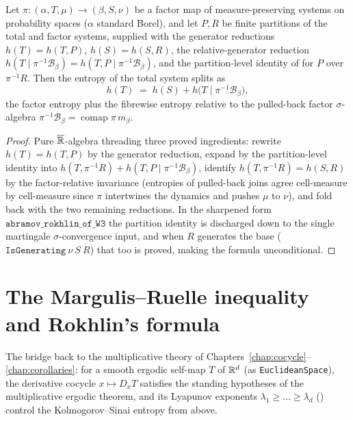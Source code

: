 \begin{theorem}\label{abramov_rokhlin}
  \leanok
  Let \(\pi:(\alpha,T,\mu)\to(\beta,S,\nu)\) be a factor map of measure-preserving systems on
  probability spaces (\(\alpha\) standard Borel), and let \(P, R\) be finite partitions of the
  total and factor systems, supplied with the generator reductions \(h(T)=h(T,P)\),
  \(h(S)=h(S,R)\), the relative-generator reduction
  \(h(T\mid\pi^{-1}\mathcal B_\beta)=h(T,P\mid\pi^{-1}\mathcal B_\beta)\), and the
  partition-level identity of  for \(P\) over \(\pi^{-1}R\). Then
  the entropy of the total system splits as
  \[
    h(T) \;=\; h(S) + h\bigl(T \mid \pi^{-1}\mathcal B_\beta\bigr),
  \]
  the factor entropy plus the fibrewise entropy relative to the pulled-back factor
  \(\sigma\)-algebra \(\pi^{-1}\mathcal B_\beta=\operatorname{comap}\pi\,m_\beta\).
\end{theorem}
\begin{proof}\leanok
  Pure \(\overline{\mathbb{R}}\)-algebra threading three proved ingredients: rewrite \(h(T)=h(T,P)\) by the
  generator reduction, expand by the partition-level identity into
  \(h(T,\pi^{-1}R)+h(T,P\mid\pi^{-1}\mathcal B_\beta)\), identify
  \(h(T,\pi^{-1}R)=h(S,R)\) by the factor-relative invariance (entropies of pulled-back joins
  agree cell-measure by cell-measure since \(\pi\) intertwines the dynamics and pushes \(\mu\) to
  \(\nu\)), and fold back with the two remaining reductions. In the sharpened form
  \(\texttt{abramov\_rokhlin\_of\_W3}\) the partition identity is discharged down to the single
  martingale \(\sigma\)-convergence input, and when \(R\) generates the base
  (\(\texttt{IsGenerating}\ \nu\ S\ R\)) that too is proved, making the formula unconditional.
\end{proof}

\section{The Margulis--Ruelle inequality and Rokhlin's formula}

The bridge back to the multiplicative theory of
Chapters~\ref{chap:cocycle}--\ref{chap:corollaries}: for a smooth ergodic self-map \(T\) of
\(\mathbb{R}^d\) (as \texttt{EuclideanSpace}), the derivative cocycle
\(x\mapsto D_xT\) satisfies the standing hypotheses of the multiplicative ergodic theorem, and
its Lyapunov exponents \(\lambda_1\ge\dots\ge\lambda_d\) () control the
Kolmogorov--Sinai entropy from above.

